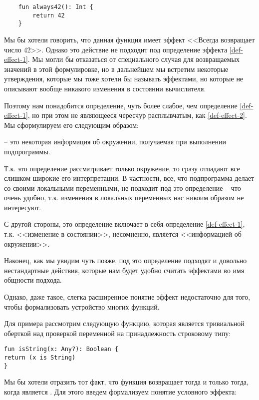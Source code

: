 \begin{verbatim}
	fun always42(): Int {
		return 42
	}
\end{verbatim}

Мы бы хотели говорить, что данная функция имеет эффект <<Всегда возвращает число 42>>. Однако это действие не подходит под определение эффекта \ref{def-effect-1}. Мы могли бы отказаться от специального случая для возвращаемых значений в этой формулировке, но в дальнейшем мы встретим некоторые утверждения, которые мы тоже хотели бы называть эффектами, но которые не описывают вообще никакого изменения в состоянии вычислителя.

Поэтому нам понадобится определение, чуть более слабое, чем определение \ref{def-effect-1}, но при этом не являющееся чересчур расплывчатым, как \ref{def-effect-2}. Мы сформулируем его следующим образом:

\begin{definition}
    \label{def-effect}
     -- это некоторая информация об окружении, получаемая при выполнении подпрограммы.
\end{definition}

Т.к. это определение рассматривает только окружение, то сразу отпадают все слишком широкие его интерпретации. В частности, все, что подпрограмма делает со своими локальными переменными, не подходит под это определение -- что очень удобно, т.к. изменения в локальных переменных нас никоим образом не интересуют.

С другой стороны, это определение включает в себя определение \ref{def-effect-1}, т.к. <<изменение в состоянии>>, несомненно, является <<информацией об окружении>>.

Наконец, как мы увидим чуть позже, под это определение подходят и довольно нестандартные действия, которые нам будет удобно считать эффектами во имя общности подхода.

\bigskip

Однако, даже такое, слегка расширенное понятие эффект недостаточно для того, чтобы формализовать устройство многих функций. 

Для примера рассмотрим следующую функцию, которая является тривиальной оберткой над проверкой переменной на принадлежность строковому типу:

\begin{verbatim}
fun isString(x: Any?): Boolean {
return (x is String)
}
\end{verbatim}

Мы бы хотели отразить тот факт, что функция возвращает  тогда и только тогда, когда  является . Для этого введем формализуем понятие условного эффекта:

